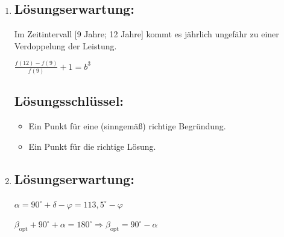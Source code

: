 \begin{langesbeispiel}
{\begin{enumerate}
$\frac{f(13)-f(0)}{13}\approx 46,8$

Im Zeitraum von 2000 bis 2013 hat die Leistung durchschnittlich um ca. 47 MW pro Jahr zugenommen.\leer
 
Das Integral gibt näherungsweise an, wie viel elektrische Energie ("`Sonnenstrom"') in den Jahren 2000 bis 2013 mithilfe von Solarzellen insgesamt erzeugt wurde.

	\subsection{Lösungsschlüssel:}
	\begin{itemize}
		\item Ein Ausgleichspunkt für die richtige Lösung und eine (sinngemäß) korrekte Interpretation.  
		
		Toleranzintervall: $[46 $MW$; 47 $MW$]$
		\item Ein Punkt für eine (sinngemäß) korrekte Interpretation.
	\end{itemize}
	
	\item \subsection{Lösungserwartung:}
			
Im Zeitintervall [9 Jahre; 12 Jahre] kommt es jährlich ungefähr zu einer Verdoppelung der Leistung.

$\frac{f(12)-f(9)}{f(9)}+1=b^3$
	
	\subsection{Lösungsschlüssel:}
	
\begin{itemize}
	\item Ein Punkt für eine (sinngemäß) richtige Begründung. 
	\item Ein Punkt für die richtige Lösung. 
\end{itemize}

\item \subsection{Lösungserwartung:}
			
$\alpha=90^\circ+\delta-\varphi=113,5^\circ-\varphi$

$\beta_\text{opt}+90^\circ+\alpha=180^\circ \Rightarrow \beta_\text{opt}=90^\circ-\alpha$\leer


\end{enumerate}}
\end{langesbeispiel}
